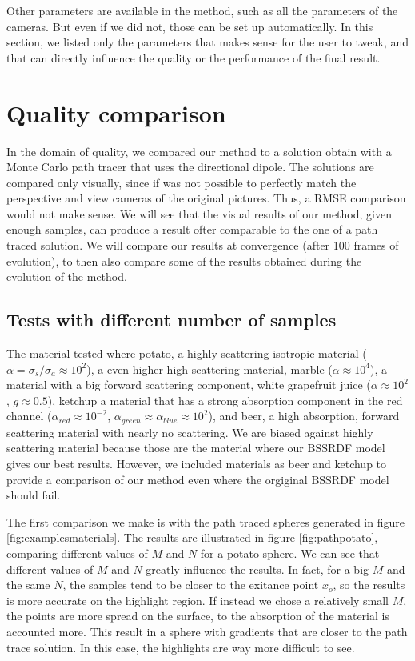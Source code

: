 Other parameters are available in the method, such as all the parameters of the cameras. But even if we did not, those can be set up automatically. In this section, we listed only the parameters that makes sense for the user to tweak, and that can directly influence the quality or the performance of the final result.

\section{Quality comparison}

In the domain of quality, we compared our method to a solution obtain with a Monte Carlo path tracer that uses the directional dipole. The solutions are compared only visually, since if was not possible to perfectly match the perspective and view cameras of the original pictures. Thus, a RMSE comparison would not make sense.  We will see that the visual results of our method, given enough samples, can produce a result ofter comparable to the one of a path traced solution. We will compare our results at convergence (after 100 frames of evolution), to then also compare some of the results obtained during the evolution of the method. 

\subsection{Tests with different number of samples}

The material tested where potato, a highly scattering isotropic material ($\alpha = \sigma_s / \sigma_a \approx 10^2$), a even higher high scattering material, marble ($\alpha \approx 10^4$), a material with a big forward scattering component, white grapefruit juice ($\alpha \approx 10^2$, $g \approx 0.5$), ketchup a material that has a strong absorption component in the red channel ($\alpha_{red} \approx 10^{-2}$, $\alpha_{green} \approx \alpha_{blue} \approx 10^2$), and beer, a high absorption, forward scattering material with nearly no scattering. We are biased against highly scattering material because those are the material where our BSSRDF model gives our best results. However, we included materials as beer and ketchup to provide a comparison of our method even where the orgiginal BSSRDF model should fail.

The first comparison we make is with the path traced spheres generated in figure \ref{fig:examplesmaterials}. The results are illustrated in figure \ref{fig:pathpotato}, comparing different values of $M$ and $N$ for a potato sphere. We can see that different values of $M$ and $N$ greatly influence the results. In fact, for a big $M$ and the same $N$, the samples tend to be closer to the exitance point $x_o$, so the results is more accurate on the highlight region. If instead we chose a relatively small $M$, the points are more spread on the surface, to the absorption of the material is accounted more. This result in a sphere with gradients that are closer to the path trace solution. In this case, the highlights are way more difficult to see. 

